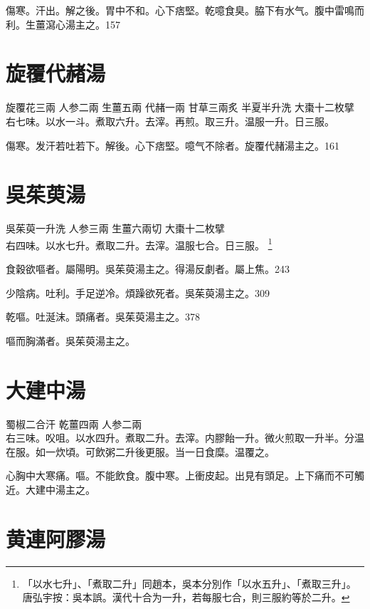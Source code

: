 傷寒。汗出。解之後。胃中不和。心下痞堅。乾噫食臭。脇下有水气。腹中雷鳴而利。生薑瀉心湯主之。157

\section{旋覆代赭湯}

旋覆花{\scriptsize 三兩} 人参{\scriptsize 二兩} 生薑{\scriptsize 五兩} 代赭{\scriptsize 一兩} 甘草{\scriptsize 三兩炙} 半夏{\scriptsize 半升洗} 大棗{\scriptsize 十二枚擘}\\
右七味。以水一斗。煮取六升。去滓。再煎。取三升。温服一升。日三服。

傷寒。发汗{\khaai 若}吐{\khaai 若}下。解後。心下痞堅。噫气不除者。旋覆代赭湯主之。161

\section{吳茱萸湯}

吳茱萸{\scriptsize 一升{\khaai 洗}} 人参{\scriptsize 三兩} 生薑{\scriptsize 六兩切} 大棗{\scriptsize 十二枚擘}\\
右四味。以水七升。煮取二升。去滓。温服七合。日三服。{\zhaoben}
	\footnote{
		「以水七升」、「煮取二升」同趙本，吳本分別作「以水五升」、「煮取三升」。唐弘宇按：吳本誤。漢代十合为一升，若每服七合，則三服約等於二升。
	}

食穀欲嘔者。屬陽明。吳茱萸湯主之。{\khaai 得湯反劇者。屬上焦。}243

少陰病。吐利。手足逆{\khaai 冷}。煩躁欲死者。吳茱萸湯主之。309

乾嘔。吐涎沫。頭痛者。吳茱萸湯主之。378

嘔而胸滿者。{\khaai 吳}茱萸湯主之。

\section{大建中湯}

蜀椒{\scriptsize 二合汗} 乾薑{\scriptsize 四兩} 人参{\scriptsize 二兩}\\
右三味。{\khaai 㕮咀。}以水四升。煮取二升。去滓。内膠飴一升。微火煎取一升半。分温在服。如一炊頃。可飲粥二升後更服。当一日食糜。温覆之。

心胸中大寒痛。嘔。不能飲食。腹中寒。上衝皮起。出見有頭足。上下痛而不可觸近。大建中湯主之。

\section{黄連阿膠湯}

